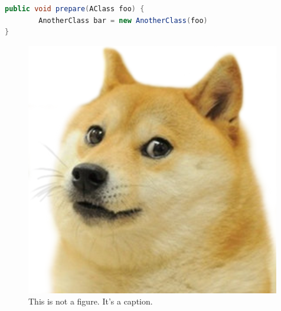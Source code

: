 \newpage


\begin{lstlisting}[language=Java, label=lst:java, caption={Some code in another language than the default one}]
public void prepare(AClass foo) {
        AnotherClass bar = new AnotherClass(foo)
}
\end{lstlisting}


\begin{figure}
\begin{center}
\includegraphics[width=0.3\columnwidth]{images/doge.png}
\end{center}
\caption{This is not a figure. It's a caption.}
\label{fig:doge}
\end{figure}
